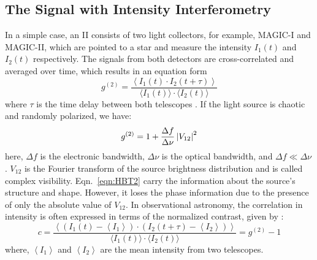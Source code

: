 \subsection{The Signal with Intensity Interferometry}\label{sec:signal}
In a simple case, an II consists of two light collectors, for example, MAGIC-I and MAGIC-II, which are pointed to a star and measure the intensity $I_1(t)$ and $I_2(t)$ respectively. The signals from both detectors are cross-correlated and averaged over time, which results in an equation form
\begin{equation}
	g^{(2)} = \frac{\left\langle I_1(t) \cdot I_2(t + \tau) \right\rangle}{\langle I_1(t) \rangle \cdot \langle I_2(t) \rangle} 
	\label{eqn:HBT}
\end{equation}
where $\tau$ is the time delay between both telescopes \citep{acciari2020optical, dravins2013optical}. If the light source is chaotic and randomly polarized, we have:
\begin{equation}
	g^{(2)} = 1 + \frac{\Delta f}{\Delta \nu} \left|V_{12}\right|^2
	\label{eqn:HBT2}
\end{equation}
here, $\Delta f$ is the electronic bandwidth, $\Delta \nu$ is the optical bandwidth, and $\Delta f \ll \Delta \nu$ \citep{acciari2020optical}. $V_{12}$ is the Fourier transform of the source brightness distribution and is called complex visibility. Eqn.~\ref{eqn:HBT2} carry the information about the source's structure and shape. However, it loses the phase information due to the presence of only the absolute value of $V_{12}$. In observational astronomy, the correlation in intensity is often expressed in terms of the normalized contrast, given by :
\begin{equation}
	c = \frac{\left\langle \left( I_1(t) - \left\langle I_1 \right\rangle \right) \cdot \left( I_2(t + \tau) - \left\langle I_2 \right\rangle \right) \right\rangle}{\langle I_1(t) \rangle \cdot \langle I_2(t) \rangle} = g^{(2)} - 1
\end{equation}
where, $\left\langle I_1 \right\rangle$ and $\left\langle I_2 \right\rangle$ are the mean intensity from two telescopes.

